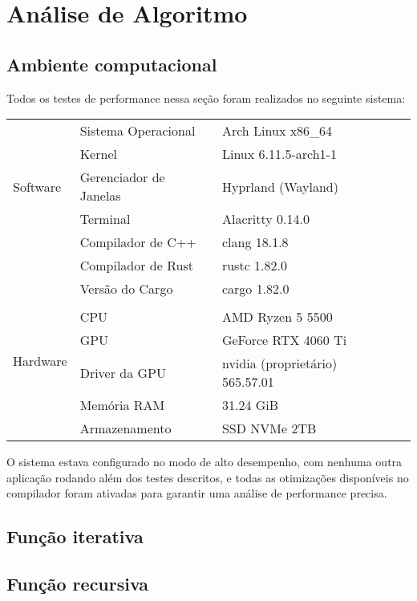 \chapter{Análise de Algoritmo}
\label{ch:anal_de_alg} %

\section{Ambiente computacional}

Todos os testes de performance nessa seção foram realizados no seguinte sistema:

\begin{table}[!ht]
	\centering
	\begin{tabular}{llll}
		\toprule
		\multirow{5}{3cm}{Software}
		 & Sistema Operacional    & Arch Linux x86\_64              & \\
		 & Kernel                 & Linux 6.11.5-arch1-1            & \\
		 & Gerenciador de Janelas & Hyprland (Wayland)              & \\
		 & Terminal               & Alacritty 0.14.0                & \\
		 & Compilador de C++      & clang 18.1.8                    & \\
		 & Compilador de Rust     & rustc 1.82.0                    & \\
		 & Versão do Cargo        & cargo 1.82.0                    & \\
		 &                        &                                 & \\
		\multirow{4}{3cm}{Hardware}
		 & CPU                    & AMD Ryzen 5 5500                & \\
		 & GPU                    & GeForce RTX 4060 Ti             & \\
		 & Driver da GPU          & nvidia (proprietário) 565.57.01 & \\
		 & Memória RAM            & 31.24 GiB                       & \\
		 & Armazenamento          & SSD NVMe 2TB                    & \\
		\bottomrule
	\end{tabular}
\end{table}

\noindent
O sistema estava configurado no modo de alto desempenho, com nenhuma outra aplicação rodando além dos testes descritos, e todas as otimizações disponíveis no compilador foram ativadas para garantir uma análise de performance precisa.

\section{Função iterativa}

\section{Função recursiva}






